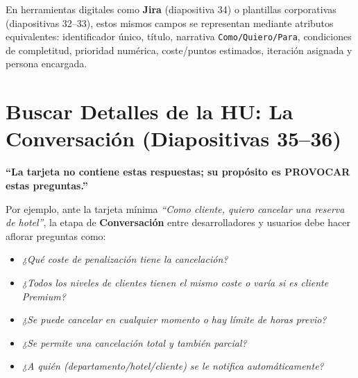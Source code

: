 \begin{center}
{%
}
\end{center}

En herramientas digitales como \textbf{Jira} (diapositiva 34) o plantillas corporativas (diapositivas 32--33), estos mismos campos se representan mediante atributos equivalentes: identificador único, título, narrativa \texttt{Como/Quiero/Para}, condiciones de completitud, prioridad numérica, coste/puntos estimados, iteración asignada y persona encargada.

\section{Buscar Detalles de la HU: La Conversación (Diapositivas 35--36)}

\begin{aviso}
\textbf{``La tarjeta no contiene estas respuestas; su propósito es PROVOCAR estas preguntas.''}
\end{aviso}

Por ejemplo, ante la tarjeta mínima \textit{``Como cliente, quiero cancelar una reserva de hotel''}, la etapa de \textbf{Conversación} entre desarrolladores y usuarios debe hacer aflorar preguntas como:
\begin{itemize}[itemsep=2pt]
    \item \textit{¿Qué coste de penalización tiene la cancelación?}
    \item \textit{¿Todos los niveles de clientes tienen el mismo coste o varía si es cliente Premium?}
    \item \textit{¿Se puede cancelar en cualquier momento o hay límite de horas previo?}
    \item \textit{¿Se permite una cancelación total y también parcial?}
    \item \textit{¿A quién (departamento/hotel/cliente) se le notifica automáticamente?}
\end{itemize}

